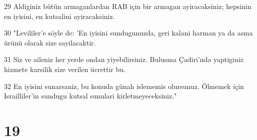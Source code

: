 \par 29 Aldiginiz bütün armaganlardan RAB için bir armagan ayiracaksiniz; hepsinin en iyisini, en kutsalini ayiracaksiniz.
\par 30 "Levililer'e söyle de: 'En iyisini sundugunuzda, geri kalani harman ya da asma ürünü olarak size sayilacaktir.
\par 31 Siz ve aileniz her yerde ondan yiyebilirsiniz. Bulusma Çadiri'nda yaptiginiz hizmete karsilik size verilen ücrettir bu.
\par 32 En iyisini sunarsaniz, bu konuda günah islememis olursunuz. Ölmemek için Israilliler'in sundugu kutsal sunulari kirletmeyeceksiniz."

\chapter{19}

